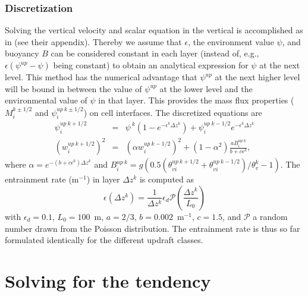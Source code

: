 \documentclass[dvipdfmx,a4paper,10pt]{article}
\begin{document}
\subsubsection{Discretization}
Solving the vertical velocity and scalar equation in the vertical is accomplished as in \cite{suselj14} (see their appendix). Thereby we assume that $\epsilon$, the environment value $\psi$, and buoyancy $B$ can be considered constant in each layer (instead of, e.g., $\epsilon(\psi^{up}-\psi)$ being constant) to obtain an analytical expression for $\psi$ at the next level. This method has the numerical advantage that $\psi^{up}$ at the next higher level will be bound in between the value of $\psi^{up}$ at the lower level and the environmental value of $\psi$ in that layer. This provides the mass flux properties ($M_i^{k\pm 1/2}$ and $\psi^{up~k\pm 1/2}_i$) on cell interfaces. The discretized equations are 
\begin{eqnarray}
 \psi_i^{up~k+1/2}&=&\psi^{~k}(1-e^{-\epsilon^{k}\Delta z^k})+\psi_i^{up~k-1/2}e^{-\epsilon^{k}\Delta z^k}\\
 (w_i^{up~k+1/2})^2&=&(\alpha w_i^{up~k-1/2})^2 + (1-\alpha^2) \frac{aB_i^{up~k}}{b+c\epsilon^k},
\end{eqnarray}
where $\alpha=e^{-(b+c\epsilon^k)\Delta z^k}$ and $B_i^{up~k}=g(0.5(\theta_{vi}^{up~k+1/2}+\theta_{vi}^{up~k-1/2})/\theta_v^{k}-1)$. The entrainment rate (m$^{-1}$) in layer $\Delta z^k$ is computed as
\begin{equation}
 \epsilon(\Delta z^k) = \frac{1}{\Delta z^k} \epsilon_d \mathcal{P}(\frac{\Delta z^k}{L_0})
\end{equation}
with $\epsilon_d=0.1$, $L_0=100$~m, $a=2/3$, $b=0.002$~m$^{-1}$, $c=1.5$, and $\mathcal{P}$ a random number drawn from the Poisson distribution. The entrainment rate is thus so far formulated identically for the different updraft classes. 

\section{Solving for the tendency}\label{sec:solve}
\end{document}
